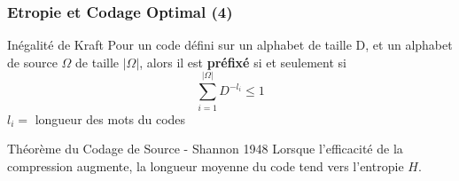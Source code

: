 \documentclass{beamer}
\begin{document}
\begin{frame}
    \frametitle{Etropie et Codage Optimal (4)}

    \begin{block}{Inégalité de Kraft}
        Pour un code défini sur un alphabet de taille D, et un alphabet de source $\Omega$ de taille 
$|\Omega|$, alors il est \textbf{préfixé} si et seulement si $$\sum _{{i=1}}^{{|\Omega |}}D^{{-l_{i}}}\leq 1$$
$l_i =$ longueur des mots du codes
    \end{block}

    \vspace*{2em}

    \begin{alertblock}{Théorème du Codage de Source - Shannon 1948}
        Lorsque l'efficacité de la compression augmente, la longueur moyenne du code tend vers l'entropie $H$.
    \end{alertblock}
    
\end{frame}
\end{document}
